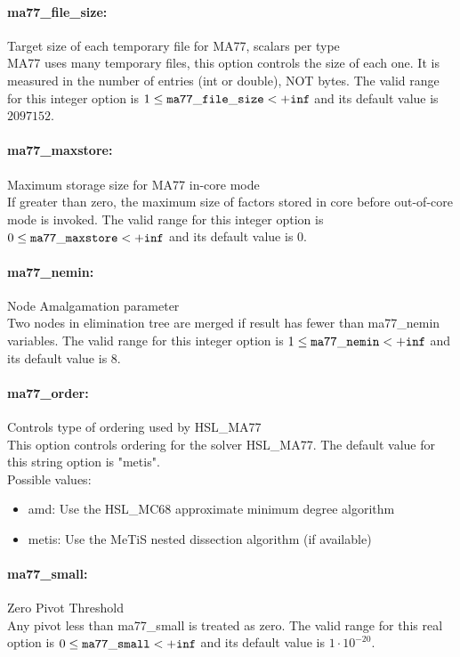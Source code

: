 \paragraph{ma77\_file\_size:}\label{opt:ma77_file_size} Target size of each temporary file for MA77, scalars per type \\
 MA77 uses many temporary files, this option controls the size of each one. It is measured in the number of entries (int or double), NOT bytes. The valid range for this integer option is
$1 \le {\tt ma77\_file\_size } <  {\tt +inf}$
and its default value is $2097152$.


\paragraph{ma77\_maxstore:}\label{opt:ma77_maxstore} Maximum storage size for MA77 in-core mode \\
 If greater than zero, the maximum size of factors stored in core before out-of-core mode is invoked. The valid range for this integer option is
$0 \le {\tt ma77\_maxstore } <  {\tt +inf}$
and its default value is $0$.


\paragraph{ma77\_nemin:}\label{opt:ma77_nemin} Node Amalgamation parameter \\
 Two nodes in elimination tree are merged if result has fewer than ma77\_nemin variables. The valid range for this integer option is
$1 \le {\tt ma77\_nemin } <  {\tt +inf}$
and its default value is $8$.


\paragraph{ma77\_order:}\label{opt:ma77_order} Controls type of ordering used by HSL\_MA77 \\
 This option controls ordering for the solver HSL\_MA77. The default value for this string option is "metis".
\\ 
Possible values:
\begin{itemize}
   \item amd: Use the HSL\_MC68 approximate minimum degree algorithm
   \item metis: Use the MeTiS nested dissection algorithm (if available)
\end{itemize}

\paragraph{ma77\_small:}\label{opt:ma77_small} Zero Pivot Threshold \\
 Any pivot less than ma77\_small is treated as zero. The valid range for this real option is 
$0 \le {\tt ma77\_small } <  {\tt +inf}$
and its default value is $1 \cdot 10^{-20}$.


